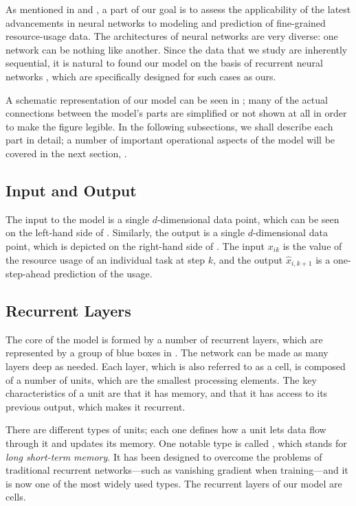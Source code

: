 
As mentioned in  and , a part of our goal is to
assess the applicability of the latest advancements in neural networks
\cite{goodfellow2016} to modeling and prediction of fine-grained resource-usage
data. The architectures of neural networks are very diverse: one network can be
nothing like another. Since the data that we study are inherently sequential, it
is natural to found our model on the basis of recurrent neural networks
\cite{goodfellow2016}, which are specifically designed for such cases as ours.

A schematic representation of our model can be seen in ; many of the
actual connections between the model's parts are simplified or not shown at all
in order to make the figure legible. In the following subsections, we shall
describe each part in detail; a number of important operational aspects of the
model will be covered in the next section, .

\subsection{Input and Output}
The input to the model is a single $d$-dimensional data point, which can be seen
on the left-hand side of . Similarly, the output is a single
$d$-dimensional data point, which is depicted on the right-hand side of
. The input $x_{ik}$ is the value of the resource usage of an
individual task at step $k$, and the output $\hat{x}_{i,k + 1}$ is a
one-step-ahead prediction of the usage.

\subsection{Recurrent Layers} 
The core of the model is formed by a number of recurrent layers, which are
represented by a group of blue boxes in . The network can be made as
many layers deep as needed. Each layer, which is also referred to as a cell, is
composed of a number of units, which are the smallest processing elements. The
key characteristics of a unit are that it has memory, and that it has access to
its previous output, which makes it recurrent.

There are different types of units; each one defines how a unit lets data flow
through it and updates its memory. One notable type is called 
\cite{hochreiter1997}, which stands for \emph{long short-term memory}. It has
been designed to overcome the problems of traditional recurrent networks---such
as vanishing gradient when training---and it is now one of the most widely used
types. The recurrent layers of our model are  cells.

